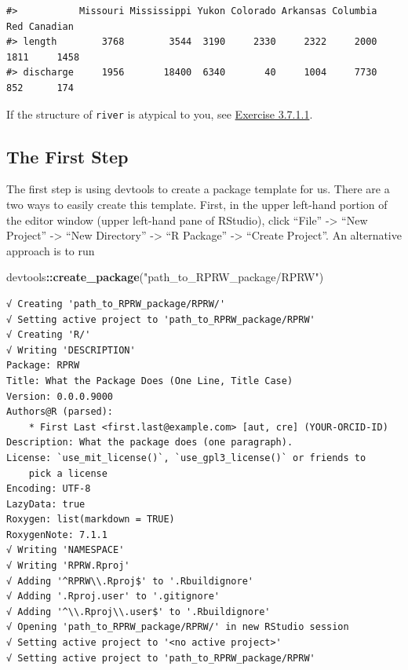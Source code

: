 \documentclass[
]{book}
\newenvironment{Shaded}{\begin{snugshade}}{\end{snugshade}}
\newcommand{\KeywordTok}[1]{\textcolor[rgb]{0.13,0.29,0.53}{\textbf{#1}}}
\newcommand{\NormalTok}[1]{#1}
\newcommand{\OperatorTok}[1]{\textcolor[rgb]{0.81,0.36,0.00}{\textbf{#1}}}
\newcommand{\StringTok}[1]{\textcolor[rgb]{0.31,0.60,0.02}{#1}}
\begin{document}
\begin{verbatim}
#>           Missouri Mississippi Yukon Colorado Arkansas Columbia  Red Canadian
#> length        3768        3544  3190     2330     2322     2000 1811     1458
#> discharge     1956       18400  6340       40     1004     7730  852      174
\end{verbatim}

If the structure of \texttt{river} is atypical to you, see \protect\hyperlink{ex-set14}{Exercise 3.7.1.1}.

\hypertarget{first-step}{%
\subsection{The First Step}\label{first-step}}

The first step is using devtools to create a package template for us. There are a two ways to easily create this template. First, in the upper left-hand portion of the editor window (upper left-hand pane of RStudio), click ``File'' -\textgreater{} ``New Project'' -\textgreater{} ``New Directory'' -\textgreater{} ``R Package'' -\textgreater{} ``Create Project''. An alternative approach is to run

\begin{Shaded}
\begin{Highlighting}[]
\NormalTok{devtools}\OperatorTok{::}\KeywordTok{create_package}\NormalTok{(}\StringTok{"path_to_RPRW_package/RPRW"}\NormalTok{)}
\end{Highlighting}
\end{Shaded}

\begin{verbatim}
√ Creating 'path_to_RPRW_package/RPRW/'
√ Setting active project to 'path_to_RPRW_package/RPRW'
√ Creating 'R/'
√ Writing 'DESCRIPTION'
Package: RPRW
Title: What the Package Does (One Line, Title Case)
Version: 0.0.0.9000
Authors@R (parsed):
    * First Last <first.last@example.com> [aut, cre] (YOUR-ORCID-ID)
Description: What the package does (one paragraph).
License: `use_mit_license()`, `use_gpl3_license()` or friends to
    pick a license
Encoding: UTF-8
LazyData: true
Roxygen: list(markdown = TRUE)
RoxygenNote: 7.1.1
√ Writing 'NAMESPACE'
√ Writing 'RPRW.Rproj'
√ Adding '^RPRW\\.Rproj$' to '.Rbuildignore'
√ Adding '.Rproj.user' to '.gitignore'
√ Adding '^\\.Rproj\\.user$' to '.Rbuildignore'
√ Opening 'path_to_RPRW_package/RPRW/' in new RStudio session
√ Setting active project to '<no active project>'
√ Setting active project to 'path_to_RPRW_package/RPRW'
\end{verbatim}
\end{document}
